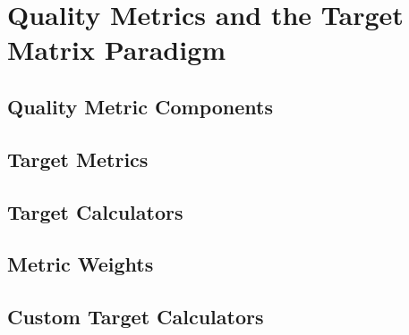 \chapter{Quality Metrics and the Target Matrix Paradigm}

\section{Quality Metric Components}

\section{Target Metrics}

\section{Target Calculators}

\section{Metric Weights}

\section{Custom Target Calculators}

